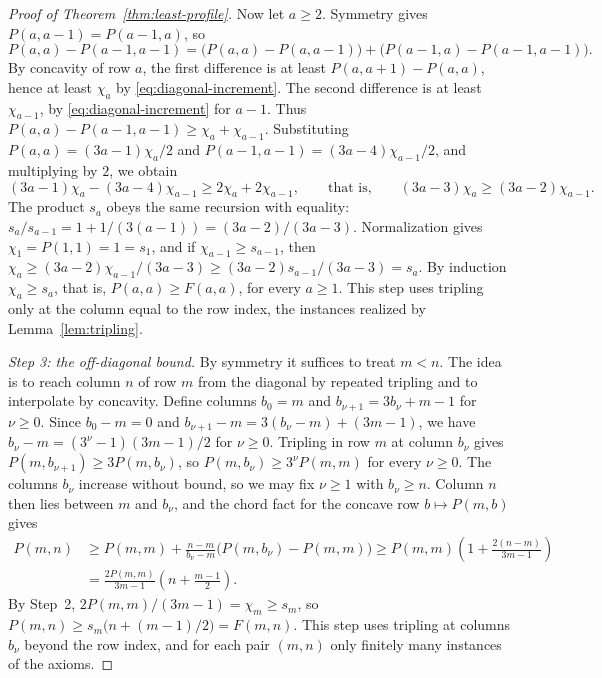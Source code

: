 \begin{proof}[Proof of Theorem~\ref{thm:least-profile}]
Now let \(a\ge2\). Symmetry gives \(P(a,a-1)=P(a-1,a)\), so
\[
 P(a,a)-P(a-1,a-1)
 =\bigl(P(a,a)-P(a,a-1)\bigr)+\bigl(P(a-1,a)-P(a-1,a-1)\bigr).
\]
By concavity of row \(a\), the first difference is at least
\(P(a,a+1)-P(a,a)\), hence at least \(\chi_a\) by
\eqref{eq:diagonal-increment}. The second difference is at least
\(\chi_{a-1}\), by \eqref{eq:diagonal-increment} for \(a-1\). Thus
\(P(a,a)-P(a-1,a-1)\ge\chi_a+\chi_{a-1}\). Substituting
\(P(a,a)=(3a-1)\chi_a/2\) and \(P(a-1,a-1)=(3a-4)\chi_{a-1}/2\), and
multiplying by \(2\), we obtain
\[
 (3a-1)\chi_a-(3a-4)\chi_{a-1}\ge2\chi_a+2\chi_{a-1},
 \qquad\text{that is,}\qquad
 (3a-3)\chi_a\ge(3a-2)\chi_{a-1}.
\]
The product \(s_a\) obeys the same recursion with equality:
\(s_a/s_{a-1}=1+1/(3(a-1))=(3a-2)/(3a-3)\). Normalization gives
\(\chi_1=P(1,1)=1=s_1\), and if \(\chi_{a-1}\ge s_{a-1}\), then
\(\chi_a\ge(3a-2)\chi_{a-1}/(3a-3)\ge(3a-2)s_{a-1}/(3a-3)=s_a\).
By induction \(\chi_a\ge s_a\), that is, \(P(a,a)\ge F(a,a)\), for
every \(a\ge1\). This step uses tripling only at the column equal to the
row index, the instances realized by Lemma~\ref{lem:tripling}.

\emph{Step 3: the off-diagonal bound.}
By symmetry it suffices to treat \(m<n\). The idea is to reach column
\(n\) of row \(m\) from the diagonal by repeated tripling and to
interpolate by concavity. Define columns \(b_0=m\) and
\(b_{\nu+1}=3b_\nu+m-1\) for \(\nu\ge0\). Since \(b_0-m=0\) and
\(b_{\nu+1}-m=3(b_\nu-m)+(3m-1)\), we have
\(b_\nu-m=(3^\nu-1)(3m-1)/2\) for \(\nu\ge0\). Tripling in row \(m\) at
column \(b_\nu\) gives \(P(m,b_{\nu+1})\ge3P(m,b_\nu)\), so
\(P(m,b_\nu)\ge3^\nu P(m,m)\) for every \(\nu\ge0\). The columns
\(b_\nu\) increase without bound, so we may fix \(\nu\ge1\) with
\(b_\nu\ge n\). Column \(n\) then lies between \(m\) and \(b_\nu\), and
the chord fact for the concave row \(b\mapsto P(m,b)\) gives
\begin{align*}
 P(m,n)&\ge P(m,m)+\frac{n-m}{b_\nu-m}\bigl(P(m,b_\nu)-P(m,m)\bigr)
 \ge P(m,m)\left(1+\frac{2(n-m)}{3m-1}\right)\\
 &=\frac{2P(m,m)}{3m-1}\left(n+\frac{m-1}2\right).
\end{align*}
By Step~2, \(2P(m,m)/(3m-1)=\chi_m\ge s_m\), so
\(P(m,n)\ge s_m\bigl(n+(m-1)/2\bigr)=F(m,n)\). This step uses tripling
at columns \(b_\nu\) beyond the row index, and for each pair \((m,n)\)
only finitely many instances of the axioms.


\end{proof}
